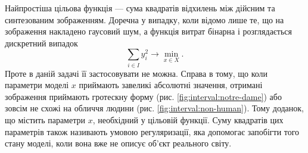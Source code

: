 Найпростіша цільова функція --- сума квадратів відхилень
між дійсним та синтезованим зображенням.
Доречна у випадку, коли відомо лише те,
що на зображення накладено гаусовий шум,
а функція витрат бінарна і розглядається дискретний випадок
\begin{equation*}
  \sum_{i \in I} y_i^2
  \to \min\limits_{x \in X}.
\end{equation*}
Проте в даній задачі її застосовувати не можна.
Справа в тому,
що коли параметри моделі $x$ приймають завеликі абсолютні значення,
отримані зображення приймають гротескну форму
(рис. \ref{fig:interval:notre-dame})
або зовсім не схожі на обличчя людини
(рис. \ref{fig:interval:non-human}).
Тому доданок, що містить параметри $x$, необхідний у цільовій функції.
Суму квадратів цих параметрів також називають умовою регуляризації,
яка допомогає запобігти того стану моделі,
коли вона вже не описує об'єкт реального світу.
